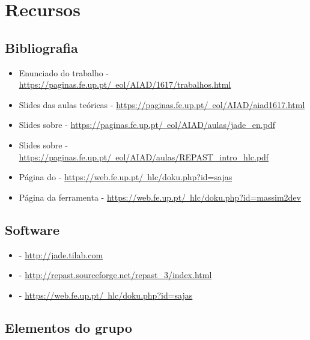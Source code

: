 \documentclass[12pt]{report}
\begin{document}
\chapter{Recursos}

\section{Bibliografia}

\begin{itemize}
	\item Enunciado do trabalho - \href{https://paginas.fe.up.pt/~eol/AIAD/1617/trabalhos.html#T05}{https://paginas.fe.up.pt/~eol/AIAD/1617/trabalhos.html}
	\item Slides das aulas teóricas - \href{https://paginas.fe.up.pt/~eol/AIAD/aiad1617.html}{https://paginas.fe.up.pt/~eol/AIAD/aiad1617.html}
	\item Slides sobre \jade - \href{https://paginas.fe.up.pt/~eol/AIAD/aulas/jade_en.pdf}{https://paginas.fe.up.pt/~eol/AIAD/aulas/jade\_en.pdf}
	\item Slides sobre \repast - \href{https://paginas.fe.up.pt/~eol/AIAD/aulas/REPAST_intro_hlc.pdf}{https://paginas.fe.up.pt/~eol/AIAD/aulas/REPAST\_intro\_hlc.pdf}
	\item Página do \sajas - \href{https://web.fe.up.pt/~hlc/doku.php?id=sajas}{https://web.fe.up.pt/~hlc/doku.php?id=sajas}
	\item Página da ferramenta \massim - \href{https://web.fe.up.pt/~hlc/doku.php?id=massim2dev}{https://web.fe.up.pt/~hlc/doku.php?id=massim2dev}
\end{itemize}

\section{Software}

\begin{itemize}
	\item \jade - \href{http://jade.tilab.com}{http://jade.tilab.com}
	\item \repast - \href{http://repast.sourceforge.net/repast_3/index.html}{http://repast.sourceforge.net/repast\_3/index.html}
	\item \sajas - \href{https://web.fe.up.pt/~hlc/doku.php?id=sajas}{https://web.fe.up.pt/~hlc/doku.php?id=sajas}
\end{itemize}

\section{Elementos do grupo}
\end{document}
